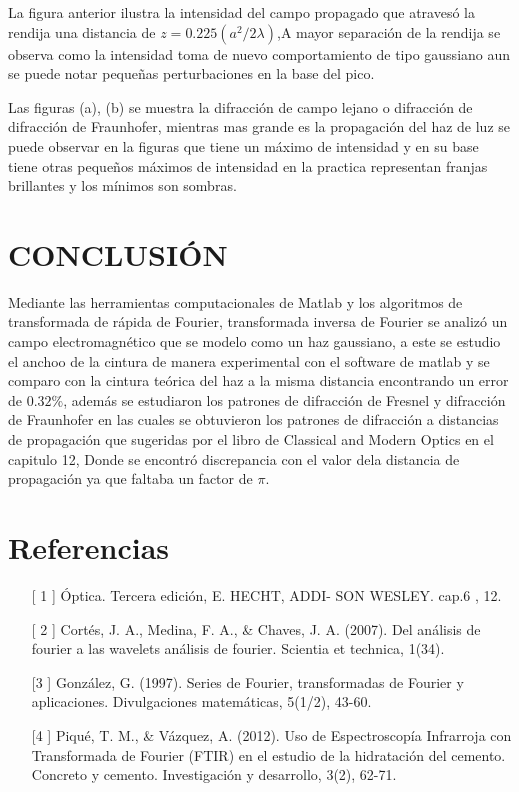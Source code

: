 \documentclass[11pt,letterpaper,twocolumn]{article}
\begin{document}
La figura anterior ilustra la intensidad del campo propagado que atravesó la rendija una distancia de $z = 0.225(a^{2}/2\lambda)$,A mayor separación de la rendija se observa como la intensidad toma de nuevo comportamiento de tipo gaussiano aun se puede notar pequeñas perturbaciones en la base del pico.



Las figuras (a), (b) se muestra la difracción de campo lejano o difracción de difracción de Fraunhofer, mientras mas grande es la propagación del haz de luz se puede observar en la figuras que tiene un máximo de intensidad y en su base tiene otras pequeños máximos de intensidad en la practica representan franjas brillantes y los mínimos son sombras.

\section{CONCLUSIÓN}
Mediante las herramientas computacionales de Matlab y los algoritmos de transformada de rápida de Fourier, transformada inversa de Fourier se analizó un campo electromagnético que se modelo  como un haz gaussiano, a este  se estudio el anchoo de la cintura de manera experimental con el software de matlab y se comparo con la cintura teórica del haz a la misma distancia encontrando un error de $0.32\%$, además se estudiaron los patrones de difracción de Fresnel   y difracción de Fraunhofer en las cuales se obtuvieron los patrones de difracción a  distancias de propagación que sugeridas por el libro de Classical and Modern Optics en el capitulo 12,
Donde se encontró discrepancia con el valor dela distancia de propagación ya que faltaba un factor de $\pi$.
\section{Referencias}
\begin{itemize}
	\item[[ 1]] Óptica. Tercera edición, E. HECHT, ADDI- SON WESLEY. cap.6 , 12.
	\item[[ 2]] Cortés, J. A., Medina, F. A., \& Chaves, J. A. (2007). Del análisis de fourier a las wavelets análisis de fourier. Scientia et technica, 1(34).
	\item[[3]] González, G. (1997). Series de Fourier, transformadas de Fourier y aplicaciones. Divulgaciones matemáticas, 5(1/2), 43-60.
	\item[[4]] Piqué, T. M., \& Vázquez, A. (2012). Uso de Espectroscopía Infrarroja con Transformada de Fourier (FTIR) en el estudio de la hidratación del cemento. Concreto y cemento. Investigación y desarrollo, 3(2), 62-71.		   
\end{itemize}
\end{document}
